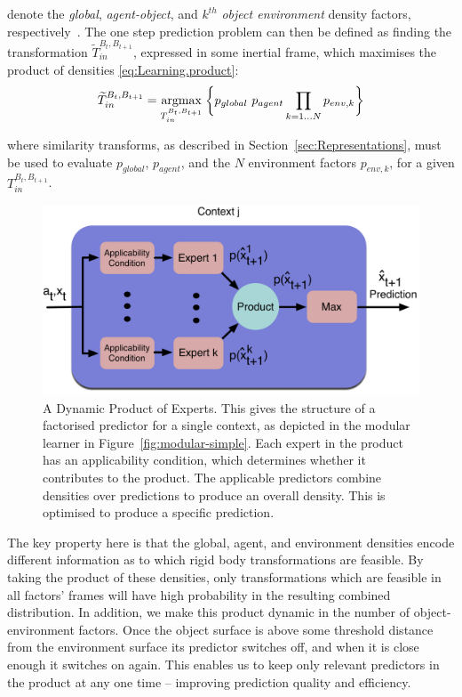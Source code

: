 \noindent denote the \textit{global}, \textit{agent-object}, and
$k^{th}$ \textit{object environment} density factors,
respectively~\citep{kopicki_prediction_2009, kopicki_prediction_2010}. 
The one step prediction problem can then be defined as finding the
transformation $\widetilde{T}_{in}^{B_{t}, B_{t+1}}$, expressed in some inertial frame, which maximises the product of densities \eqref{eq:Learning.product}:
\begin{equation}
\widetilde{T}_{in}^{B_{t}, B_{t+1}} = \underset{T_{in}^{B_{t}, B_{t+1}}}{\operatorname{argmax}}\medspace \bigg\lbrace
p_{global}\  p_{agent} \mathop{\prod}_{k=1 \ldots N}{ p_{env,k} }
\bigg\rbrace
\label{eq:Learning.MultiFactorProduct}
\end{equation}

\noindent where similarity transforms, as described in Section~\ref{sec:Representations}, must be used to evaluate $p_{global}$, $p_{agent}$, and the $N$ environment factors $p_{env,k}$, for a given ${T}_{in}^{B_{t}, B_{t+1}}$.
\begin{figure}[t]
\centerline{\includegraphics[width=\columnwidth]{product-predictor}}
\caption[Factored Prediction]{A Dynamic Product of Experts. This gives the structure of a factorised predictor for a single context, as depicted in the modular learner in Figure~\ref{fig:modular-simple}. Each expert in the product has an applicability condition, which determines whether it contributes to the product. The applicable predictors combine densities over predictions to produce an overall density. This is optimised to produce a specific prediction.}
\label{fig:modular}
\end{figure}

The key property here is that the global, agent, and environment densities encode different information as to which rigid body transformations are feasible. By taking the product of these densities, only transformations which are feasible in all factors' frames will have high probability in the resulting combined distribution. In addition, we make this product dynamic in the number of object-environment factors. Once the object surface is above some threshold distance from the environment surface its predictor switches off, and when it is close enough it switches on again. This enables us to keep only relevant predictors in the product at any one time -- improving prediction quality and efficiency. 

